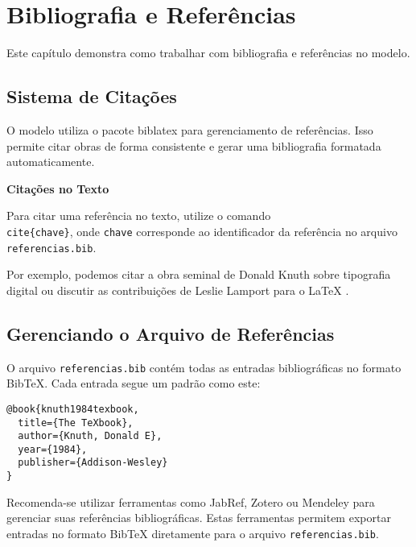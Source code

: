 \section{Bibliografia e Referências}

Este capítulo demonstra como trabalhar com bibliografia e referências no modelo.

\subsection{Sistema de Citações}

O modelo utiliza o pacote biblatex para gerenciamento de referências. Isso permite citar obras de forma consistente e gerar uma bibliografia formatada automaticamente.

\begin{rule}
\textbf{Citações no Texto}

Para citar uma referência no texto, utilize o comando \texttt{\\cite\{chave\}}, onde \texttt{chave} corresponde ao identificador da referência no arquivo \texttt{referencias.bib}.
\end{rule}

Por exemplo, podemos citar a obra seminal de Donald Knuth sobre tipografia digital \cite{knuth1984texbook} ou discutir as contribuições de Leslie Lamport para o LaTeX \cite{lamport1994latex}.


\subsection{Gerenciando o Arquivo de Referências}

O arquivo \texttt{referencias.bib} contém todas as entradas bibliográficas no formato BibTeX. Cada entrada segue um padrão como este:

\begin{verbatim}
@book{knuth1984texbook,
  title={The TeXbook},
  author={Knuth, Donald E},
  year={1984},
  publisher={Addison-Wesley}
}
\end{verbatim}

\begin{dmnote}
Recomenda-se utilizar ferramentas como JabRef, Zotero ou Mendeley para gerenciar suas referências bibliográficas. Estas ferramentas permitem exportar entradas no formato BibTeX diretamente para o arquivo \texttt{referencias.bib}.
\end{dmnote}

